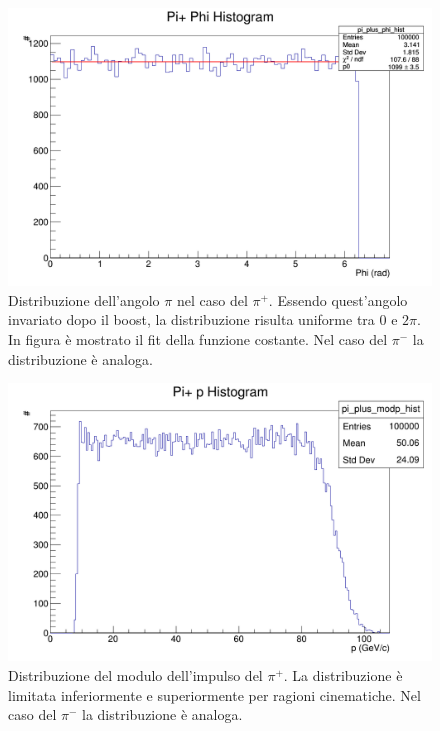 \documentclass[8pt]{extarticle}
\begin{document}
\begin{figure}
	\begin{center}
		\includegraphics[scale=0.3]{gen_phi} 
		\caption{Distribuzione dell'angolo $\pi$ nel caso del $\pi^+$. Essendo quest'angolo invariato dopo il boost, la distribuzione risulta uniforme tra $0$ e $2\pi$. In figura è mostrato il fit della funzione costante. Nel caso del $\pi^-$ la distribuzione è analoga.}
		\label{fig:gen_phi}
	\end{center}
\end{figure}

\begin{figure}
	\begin{center}
		\includegraphics[scale=0.3]{gen_p} 
		\caption{Distribuzione del modulo dell'impulso del $\pi^+$. La distribuzione è limitata inferiormente e superiormente per ragioni cinematiche. Nel caso del $\pi^-$ la distribuzione è analoga.}
		\label{fig:gen_p}
	\end{center}
\end{figure}
\end{document}
